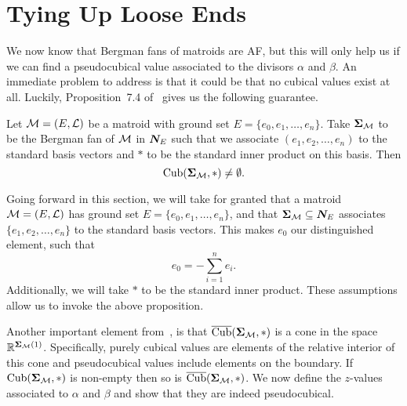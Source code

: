 \documentclass[12pt,oneside]{../../sfsuthesis}
\begin{document}
\section{Tying Up Loose Ends}

We now know that Bergman fans of matroids are AF, but this will only help us if we can find a pseudocubical value associated to the divisors \( \alpha \) and \( \beta \).
An immediate problem to address is that it could be that no cubical values exist at all.
Luckily, Proposition~7.4 of~\cite{nathansonTropicalFansNormal2023} gives us the following guarantee.
\begin{proposition}\th\label{thm:existCubical}
    Let \( \mathcal{M} = (E, \mathcal{L}) \) be a matroid with ground set \( E = \{ e_0, e_1, \dots, e_n \} \).
    Take \( {\bm{\Sigma}}_{\mathcal{M}} \) to be the Bergman fan of \( \mathcal{M} \) in \( \bm{N}_E \) such that we associate \( (e_1, e_2, \dots, e_n) \) to the standard basis vectors and \( \ast \) to be the standard inner product on this basis.
    Then
    \[
        \operatorname{Cub}({\bm{\Sigma}}_{\mathcal{M}}, \ast) \neq \emptyset.
    \]
\end{proposition}

Going forward in this section, we will take for granted that a matroid \( \mathcal{M} = (E, \mathcal{L}) \) has ground set \( E = \{ e_0, e_1, \dots, e_n \} \), and that \( {\bm{\Sigma}}_{\mathcal{M}} \subseteq \bm{N}_E \) associates \( \{e_1, e_2, \dots, e_n\} \) to the standard basis vectors.
This makes \( e_0 \) our distinguished element, such that
\[
    e_0 = -\sum_{i=1}^n e_i.
\]
Additionally, we will take \( \ast \) to be the standard inner product.
These assumptions allow us to invoke the above proposition.

Another important element from~\cite{nathansonTropicalFansNormal2023}, is that \( \operatorname{\overline{Cub}}({\bm{\Sigma}}_{\mathcal{M}}, \ast) \) is a cone in the space \( \mathbb{R}^{{\bm{\Sigma}}_{\mathcal{M}}(1)} \).
Specifically, purely cubical values are elements of the relative interior of this cone and pseudocubical values include elements on the boundary.
If \( \operatorname{Cub}({\bm{\Sigma}}_{\mathcal{M}}, \ast) \) is non-empty then so is \( \operatorname{\overline{Cub}}({\bm{\Sigma}}_{\mathcal{M}}, \ast) \).
We now define the \( z \)-values associated to \( \alpha \) and \( \beta \) and show that they are indeed pseudocubical.
\end{document}
